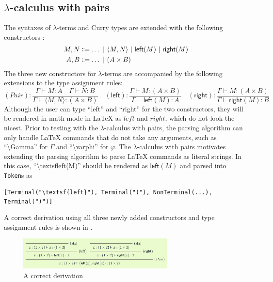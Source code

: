 \subsection{$\lambda$-calculus with pairs}
\label{evaluation:lambda-pairs}
The syntaxes of $\lambda$-terms and Curry types are extended with the following constructors \cite{van-bakel:2022}:
\begin{align*}
    M, N &\Coloneqq \ldots \ |\  \langle M, N \rangle \ |\  \textsf{left}(M) \ |\  \textsf{right}(M) \\
    A, B &\Coloneqq \ldots \ |\  (A \times B)
\end{align*}
The three new constructors for $\lambda$-terms are accompanied by the following extensions to the type assignment rules:
\[
    (\textit{Pair}): \frac{\Gamma \vdash M: A \quad \Gamma \vdash N: B}{\Gamma \vdash \langle M, N \rangle: (A \times B)} \quad (\textsf{left}): \frac{\Gamma \vdash M: (A \times B)}{\Gamma \vdash \textsf{left}(M): A} \quad (\textsf{right}): \frac{\Gamma \vdash M: (A \times B)}{\Gamma \vdash \textsf{right}(M): B}
\]
Although the user can type ``left'' and ``right'' for the two constructors, they will be rendered in math mode in \LaTeX{} as $left$ and $right$, which do not look the nicest. Prior to testing with the $\lambda$-calculus with pairs, the parsing algorithm can only handle \LaTeX{} commands that do not take any arguments, such as ``\textbackslash Gamma'' for $\Gamma$ and ``\textbackslash varphi'' for $\varphi$. The $\lambda$-calculus with pairs motivates extending the parsing algorithm to parse \LaTeX{} commands as literal strings. In this case, ``\textbackslash textsf{left}(M)'' should be rendered as $\textsf{left}(M)$ and parsed into \lstinline{Token}s as
\begin{center}
    \lstinline|[Terminal("\textsf{left}"), Terminal("("), NonTerminal(...), Terminal(")")]|
\end{center}
A correct derivation using all three newly added constructors and type assignment rules is shown in .
\begin{figure}[!htbp]
    \centering
    \includegraphics[width=0.7\textwidth]{evaluation/lambda-with-pairs.png}
    \caption{A correct derivation }
    \label{fig:lambda-with-pairs}
\end{figure}

